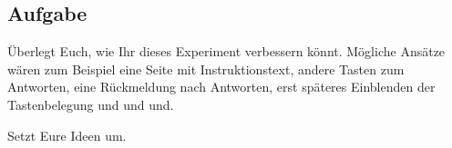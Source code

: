 \documentclass[
]{book}
\begin{document}
\hypertarget{aufgabe-13}{%
\subsection{Aufgabe}\label{aufgabe-13}}

Überlegt Euch, wie Ihr dieses Experiment verbessern könnt.
Mögliche Ansätze wären zum Beispiel eine Seite mit Instruktionstext, andere Tasten zum Antworten, eine Rückmeldung nach Antworten, erst späteres Einblenden der Tastenbelegung und und und.

Setzt Eure Ideen um.

  
\end{document}
